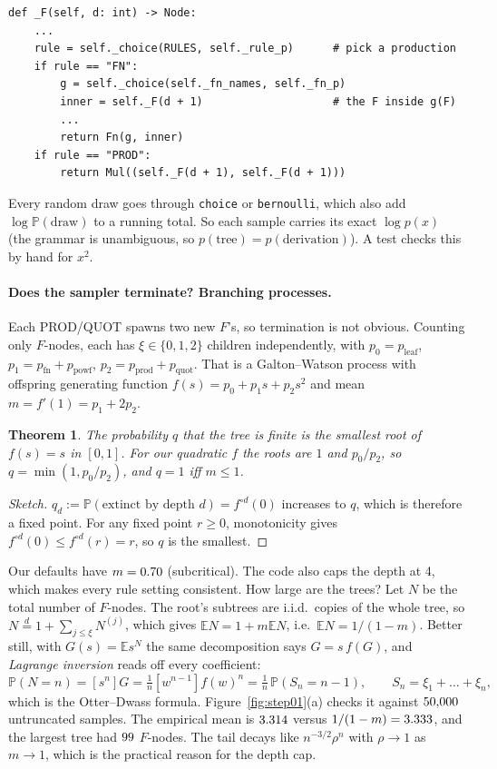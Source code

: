 \documentclass[11pt]{article}
\theoremstyle{definition}
\theoremstyle{plain}
\newtheorem{theorem}[definition]{Theorem}
\theoremstyle{remark}
\newcommand{\E}{\mathbb{E}}
\renewcommand{\P}{\mathbb{P}}
\newcommand{\code}[1]{\texttt{#1}}
\renewcommand{\_}{\oldunderscore\allowbreak}
\newcommand{\file}[1]{\textcolor{blue!50!black}{\texttt{#1}}}
\newcommand{\codefrom}[1]{\par\smallskip\noindent{\footnotesize\textbf{From} \file{#1}}}
\begin{document}
\codefrom{src/calcdiff/generate/grammar.py}
\begin{lstlisting}
def _F(self, d: int) -> Node:
    ...
    rule = self._choice(RULES, self._rule_p)      # pick a production
    if rule == "FN":
        g = self._choice(self._fn_names, self._fn_p)
        inner = self._F(d + 1)                    # the F inside g(F)
        ...
        return Fn(g, inner)
    if rule == "PROD":
        return Mul((self._F(d + 1), self._F(d + 1)))
\end{lstlisting}
Every random draw goes through \code{\_choice} or \code{\_bernoulli}, which also add $\log\P(\text{draw})$
to a running total. So each sample carries its exact $\log p(x)$ (the grammar is
unambiguous, so $p(\text{tree}) = p(\text{derivation})$). A test checks this by hand for $x^2$.

\paragraph{Does the sampler terminate? Branching processes.}
Each PROD/QUOT spawns two new $F$'s, so termination is not obvious. Counting only $F$-nodes,
each has $\xi\in\{0,1,2\}$ children independently, with $p_0=p_{\mathrm{leaf}}$,
$p_1=p_{\mathrm{fn}}+p_{\mathrm{powf}}$, $p_2=p_{\mathrm{prod}}+p_{\mathrm{quot}}$. That is a Galton--Watson process
with offspring generating function $f(s)=p_0+p_1s+p_2s^2$ and mean $m=f'(1)=p_1+2p_2$.

\begin{theorem}\label{thm:ext}
The probability $q$ that the tree is finite is the smallest root of $f(s)=s$ in $[0,1]$.
For our quadratic $f$ the roots are $1$ and $p_0/p_2$, so $q=\min(1,p_0/p_2)$, and $q=1$ iff $m\le1$.
\end{theorem}
\begin{proof}[Sketch]
$q_d:=\P(\text{extinct by depth }d)=f^{\circ d}(0)$ increases to $q$, which is therefore a fixed point.
For any fixed point $r\ge0$, monotonicity gives $f^{\circ d}(0)\le f^{\circ d}(r)=r$, so $q$ is the smallest.
\end{proof}

Our defaults have $m=0.70$ (subcritical). The code also caps the depth at 4, which makes
every rule setting consistent.
How large are the trees? Let $N$ be the total number of $F$-nodes. The root's subtrees are
i.i.d.\ copies of the whole tree, so $N\overset d=1+\sum_{j\le\xi}N^{(j)}$, which gives
$\E N=1+m\E N$, i.e.\ $\E N=1/(1-m)$. Better still, with $G(s)=\E s^N$ the same decomposition
says $G=s\,f(G)$, and \emph{Lagrange inversion} reads off every coefficient:
\begin{equation}\label{eq:dwass}
  \P(N=n)=[s^n]G=\tfrac1n[w^{n-1}]f(w)^n=\tfrac1n\,\P(S_n=n-1),\qquad S_n=\xi_1+\dots+\xi_n,
\end{equation}
which is the Otter--Dwass formula. Figure~\ref{fig:step01}(a) checks it against $50{,}000$ untruncated
samples. The empirical mean is $3.314$ versus $1/(1-m)=3.333$, and the largest tree had $99$
$F$-nodes. The tail decays like $n^{-3/2}\rho^n$ with $\rho\to1$ as $m\to1$, which is the practical
reason for the depth cap.
\end{document}
